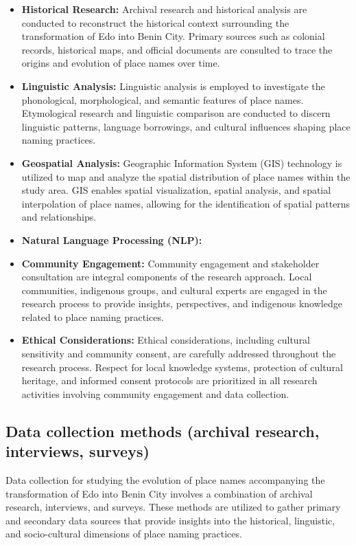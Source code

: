 \begin{itemize}
    \item \textbf{Historical Research:} Archival research and historical analysis are conducted to reconstruct the historical context surrounding the transformation of Edo into Benin City. Primary sources such as colonial records, historical maps, and official documents are consulted to trace the origins and evolution of place names over time.

    \item \textbf{Linguistic Analysis:} Linguistic analysis is employed to investigate the phonological, morphological, and semantic features of place names. Etymological research and linguistic comparison are conducted to discern linguistic patterns, language borrowings, and cultural influences shaping place naming practices.

    \item \textbf{Geospatial Analysis:} Geographic Information System (GIS) technology is utilized to map and analyze the spatial distribution of place names within the study area. GIS enables spatial visualization, spatial analysis, and spatial interpolation of place names, allowing for the identification of spatial patterns and relationships.

\item \textbf{Natural Language Processing (NLP):} 	

    \item \textbf{Community Engagement:} Community engagement and stakeholder consultation are integral components of the research approach. Local communities, indigenous groups, and cultural experts are engaged in the research process to provide insights, perspectives, and indigenous knowledge related to place naming practices.

    \item \textbf{Ethical Considerations:} Ethical considerations, including cultural sensitivity and community consent, are carefully addressed throughout the research process. Respect for local knowledge systems, protection of cultural heritage, and informed consent protocols are prioritized in all research activities involving community engagement and data collection.
\end{itemize}

\subsection{Data collection methods (archival research, interviews, surveys)}
Data collection for studying the evolution of place names accompanying the transformation of Edo into Benin City involves a combination of archival research, interviews, and surveys. These methods are utilized to gather primary and secondary data sources that provide insights into the historical, linguistic, and socio-cultural dimensions of place naming practices.

